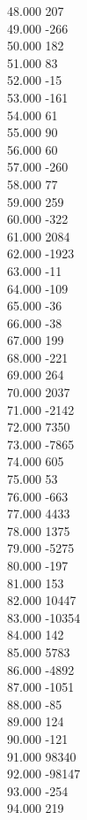 { 48.000	207 \\
 49.000	-266 \\
 50.000	182 \\
 51.000	83 \\
 52.000	-15 \\
 53.000	-161 \\
 54.000	61 \\
 55.000	90 \\
 56.000	60 \\
 57.000	-260 \\
 58.000	77 \\
 59.000	259 \\
 60.000	-322 \\
 61.000	2084 \\
 62.000	-1923 \\
 63.000	-11 \\
 64.000	-109 \\
 65.000	-36 \\
 66.000	-38 \\
 67.000	199 \\
 68.000	-221 \\
 69.000	264 \\
 70.000	2037 \\
 71.000	-2142 \\
 72.000	7350 \\
 73.000	-7865 \\
 74.000	605 \\
 75.000	53 \\
 76.000	-663 \\
 77.000	4433 \\
 78.000	1375 \\
 79.000	-5275 \\
 80.000	-197 \\
 81.000	153 \\
 82.000	10447 \\
 83.000	-10354 \\
 84.000	142 \\
 85.000	5783 \\
 86.000	-4892 \\
 87.000	-1051 \\
 88.000	-85 \\
 89.000	124 \\
 90.000	-121 \\
 91.000	98340 \\
 92.000	-98147 \\
 93.000	-254 \\
 94.000	219 \\
}
